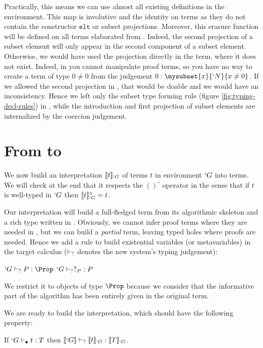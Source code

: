 \documentclass{llncs}
\def\id#1{\texttt{#1}}
\begin{document}
Practically, this means we can use almost all existing definitions in the
\Coq environment. This map is involutive and
the identity on \Russell terms as they do not contain the constructor
$\id{elt}$ or subset projections. Moreover, this erasure function will be
defined on all \Coq terms elaborated from \Russell.
Indeed, the second projection of a
subset element will only appear in the second component of a subset
element. Otherwise, we would have used the projection directly in the
\Russell{} term, where it does not exist.
Indeed, in \PVS{} you cannot manipulate proof terms, so you have no way to create a
term of type $0 \neq 0$ from the judgement $0 : \mysubset{x}{`N}{x \neq
  0}$. If we allowed the second projection in \Russell, that would be doable
and we would have an inconsistency.
Hence we left only the subset type forming rule (figure
\vref{fig:typing-decl-rules}) in \Russell, while the introduction and
first projection of subset elements are internalized by the coercion judgement.

\section{From \lng{} to \CICq{}}
\label{sec:Translation}
We now build an interpretation
$\llbracket t \rrbracket_{`G}$ of \Russell terms $t$ in environment $`G$ into \CIC
terms. We will check at the end that it respects the $()^{\circ}$ operator
in the sense that if $t$ is well-typed in $`G$ then $\llbracket t \rrbracket_{`G}^{\circ} = t$.

Our interpretation will build a full-fledged \CIC term from its
algorithmic skeleton and a rich type written in \Russell. Obviously, we
cannot infer proof terms where they are needed in \CIC, but we can build
a \emph{partial} term, leaving typed holes where proofs are
needed. Hence we add a rule to build existential variables (or
metavariables) in the target calculus ($\vdash_{?}$ denotes the new system's typing judgement):

\begin{center}
  \vspace{-1em}
  \UAX{}
  {$`G \typeq P : \Prop$}
  {$`G \vdash_{?} ?_{P} : P$}
  {}
  \DP
  \vspace{-1em}
\end{center}
We restrict it to objects of type $\Prop$ because we consider that the
informative part of the algorithm has been entirely given in the
original term. 

We are ready to build the interpretation, which should have the following property:
\begin{theorem}
  \label{interp-correct}
  If $`G \vdash_{\bullet} t : T$ then $\llbracket `G \rrbracket \vdash_{?} \llbracket t \rrbracket_{`G} : \llbracket T \rrbracket_{`G}$.
\end{theorem}
\end{document}
